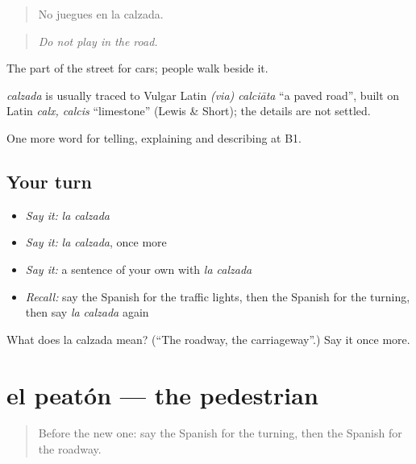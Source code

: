 \begin{quote}
No juegues en la calzada.
\end{quote}

\begin{quote}
\emph{Do not play in the road.}
\end{quote}

The part of the street for cars; people walk beside it.

\begin{cousinweb}
\emph{calzada} is usually traced to Vulgar Latin \emph{(via) calciāta} \textquotedblleft{}a paved road\textquotedblright{}, built on Latin \emph{calx, calcis} \textquotedblleft{}limestone\textquotedblright{} (Lewis \& Short); the details are not settled.
\end{cousinweb}

\begin{grammarlens}[title={What you've built}]
One more word for telling, explaining and describing at B1.
\end{grammarlens}

\subsection*{Your turn}
\begin{itemize}
\raggedright
  \item \emph{Say it:} \emph{la calzada}
  \item \emph{Say it:} \emph{la calzada}, once more
  \item \emph{Say it:} a sentence of your own with \emph{la calzada}
  \item \emph{Recall:} say the Spanish for the traffic lights, then the Spanish for the turning, then say \emph{la calzada} again
\end{itemize}

\begin{tcolorbox}[breakable,colback=teal!4,colframe=teal!35!black,title={Before you move on}]
What does la calzada mean? (\textquotedblleft{}The roadway, the carriageway\textquotedblright{}.) Say it once more.
\end{tcolorbox}
\section[el peatón]{el peatón — the pedestrian}

\label{lesson:ES-C647-peaton}



\begin{quote}
Before the new one: say the Spanish for the turning, then the Spanish for the roadway.
\end{quote}

